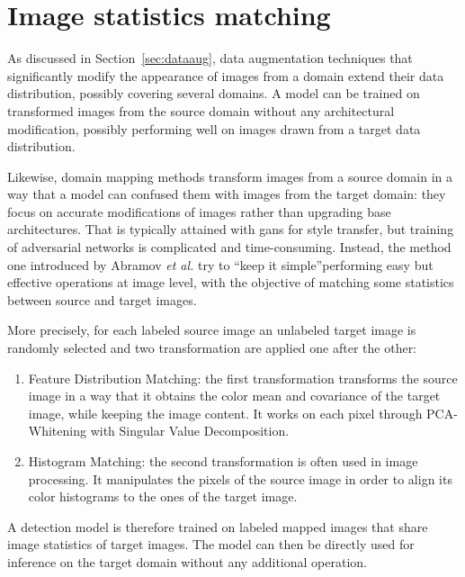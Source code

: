 \documentclass[%
    corpo=12pt,
    twoside,
    stile=classica,   
    tipotesi=magistrale,
    evenboxes,
    english,
	numerazioneromana,
]{toptesi}
\begin{document}
\section{Image statistics matching}
As discussed in Section~\ref{sec:dataaug}, data augmentation techniques that significantly modify the appearance of images from a domain extend their data distribution, possibly covering several domains. A model can be trained on transformed images from the source domain without any architectural modification, possibly performing well on images drawn from a target data distribution.

Likewise, domain mapping methods transform images from a source domain in a way that a model can confused them with images from the target domain: they focus on accurate modifications of images rather than upgrading base architectures. That is typically attained with \glspl{gan} for style transfer, but training of adversarial networks is complicated and time-consuming. Instead, the method one introduced by Abramov \textit{et al.}\cite{abramov2020simple} try to \textquotedblleft keep it simple\textquotedblright performing easy but effective operations at image level, with the objective of matching some statistics between source and target images.

More precisely, for each labeled source image an unlabeled target image is randomly selected and two transformation are applied one after the other:
\begin{enumerate}
	\item Feature Distribution Matching: the first transformation transforms the source image in a way that it obtains the color mean and covariance of the target image, while keeping the image content. It works on each pixel through PCA-Whitening with Singular Value Decomposition.
	\item Histogram Matching: the second transformation is often used in image processing. It manipulates the pixels of the source image in order to align its color histograms to the ones of the target image.
\end{enumerate}
A detection model is therefore trained on labeled mapped images that share image statistics of target images. The model can then be directly used for inference on the target domain without any additional operation.
\end{document}
